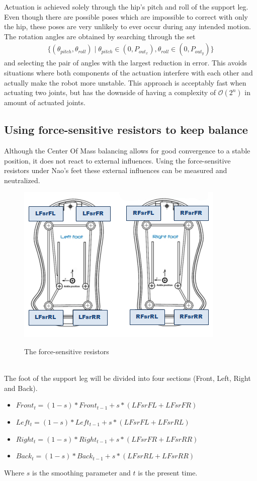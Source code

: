 \documentclass[a4paper]{article}
\begin{document}
Actuation is achieved solely through the hip's pitch and roll of the support
leg. Even though there are possible poses which are impossible to correct with
only the hip, these poses are very unlikely to ever occur during any intended motion.
The rotation angles are obtained by searching through the set
\begin{align*}
  \{ (\theta_{pitch}, \theta_{roll}) \mid \theta_{pitch} \in (0, P_{out_{x}}),
  \theta_{roll} \in (0, P_{out_{y}}) \}
\end{align*}
and selecting the pair of angles with the largest reduction in error. This
avoids situations where both components of the actuation interfere with
each other and actually make the robot more unstable. This approach is acceptably
fast when actuating two joints, but has the downside of having a complexity of
$\mathcal{O}(2^n)$ in amount of actuated joints.

\subsection{Using force-sensitive resistors to keep balance}

Although the Center Of Mass balancing allows for good convergence to a
stable position, it does not react to external influences.
Using the force-sensitive resistors under Nao's feet these external influences can be measured and neutralized.
\begin{figure}[htb]
	\centering
	\includegraphics[scale=0.75]{pics/naosfeet.jpg}
	\label{fig:fsr_plot}
	\caption{The force-sensitive resistors}
\end{figure}\\
The foot of the support leg will be divided into four sections (Front, Left, Right and Back). 
\begin{itemize}
    \item $Front_t = (1-s) * Front_{t-1} + s * (LFsrFL + LFsrFR)$
    \item $Left_t = (1-s) * Left_{t-1} + s *(LFsrFL + LFsrRL)$
    \item $Right_t = (1-s) * Right_{t-1} + s *(LFsrFR + LFsrRR)$
    \item $Back_t = (1-s) * Back_{t-1} + s *(LFsrRL + LFsrRR)$ 
\end{itemize}
Where $s$ is the smoothing parameter and $t$ is the present time.
\end{document}
